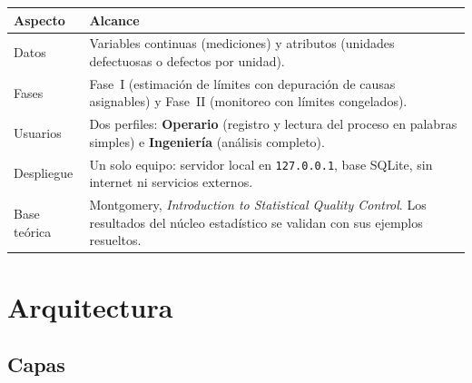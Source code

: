 \documentclass[11pt,a4paper]{article}
\begin{document}
\begin{tabularx}{\linewidth}{@{}P{3cm}L@{}}
\toprule
\textbf{Aspecto} & \textbf{Alcance}\\
\midrule
Datos & Variables continuas (mediciones) y atributos (unidades defectuosas o defectos por unidad).\\
Fases & Fase~I (estimación de límites con depuración de causas asignables) y Fase~II (monitoreo con límites congelados).\\
Usuarios & Dos perfiles: \textbf{Operario} (registro y lectura del proceso en palabras simples) e \textbf{Ingeniería} (análisis completo).\\
Despliegue & Un solo equipo: servidor local en \texttt{127.0.0.1}, base SQLite, sin internet ni servicios externos.\\
Base teórica & Montgomery, \emph{Introduction to Statistical Quality Control}. Los resultados del núcleo estadístico se validan con sus ejemplos resueltos.\\
\bottomrule
\end{tabularx}

\section{Arquitectura}

\subsection{Capas}
\end{document}
